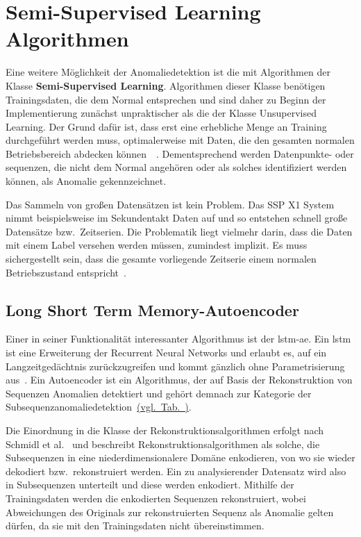 \section{Semi-Supervised Learning Algorithmen}
Eine weitere Möglichkeit der Anomaliedetektion ist die mit Algorithmen der Klasse \textbf{Semi-Supervised Learning}. Algorithmen dieser Klasse benötigen
Trainingsdaten, die dem Normal entsprechen und sind daher zu Beginn der Implementierung zunächst unpraktischer als die der Klasse Unsupervised Learning.
Der Grund dafür ist, dass erst eine erhebliche Menge an Training durchgeführt werden muss, optimalerweise mit Daten, die den gesamten normalen Betriebsbereich
abdecken können~\cite[S.~2-4]{Chapelle2010}~\cite{Schmidl2022}. Dementsprechend werden Datenpunkte- oder sequenzen, die nicht dem Normal angehören oder
als solches identifiziert werden können, als Anomalie gekennzeichnet.

Das Sammeln von großen Datensätzen ist kein Problem. Das SSP X1 System nimmt beispielsweise im Sekundentakt Daten auf und so entstehen schnell große
Datensätze bzw.~Zeitserien. Die Problematik liegt vielmehr darin, dass die Daten mit einem Label versehen werden müssen, zumindest implizit. Es muss
sichergestellt sein, dass die gesamte vorliegende Zeitserie einem normalen Betriebszustand entspricht~\cite[S.~10~ff]{Chapelle2010}.

\subsection{Long Short Term Memory-Autoencoder}
Einer in seiner Funktionalität interessanter Algorithmus ist der \ac{lstm-ae}. Ein \ac{lstm} ist eine Erweiterung der
Recurrent Neural Networks und erlaubt es, auf ein Langzeitgedächtnis zurückzugreifen und kommt gänzlich ohne Parametrisierung aus~\cite{Hochreiter1997}.
Ein Autoencoder ist ein Algorithmus, der auf Basis der Rekonstruktion von Sequenzen Anomalien detektiert und gehört demnach zur Kategorie der
Subsequenzanomaliedetektion~\hyperref[tab:algorithmen]{(vgl.~Tab.~)}.

Die Einordnung in die Klasse der Rekonstruktionsalgorithmen erfolgt nach Schmidl et al.~\cite{Schmidl2022} und beschreibt Rekonstruktionsalgorithmen
als solche, die Subsequenzen in eine niederdimensionalere Do\-mäne enkodieren, von wo sie wieder dekodiert bzw.~rekonstruiert werden. Ein zu analysierender
Datensatz wird also in Subsequenzen unterteilt und diese werden enkodiert. Mithilfe der Trainingsdaten werden die enkodierten Sequenzen rekonstruiert,
wobei Abweichungen des Originals zur rekonstruierten Sequenz als Anomalie gelten dürfen, da sie mit den Trainingsdaten nicht übereinstimmen.

